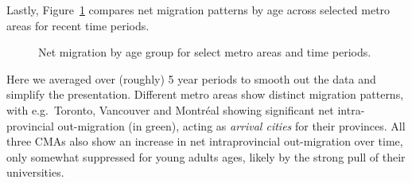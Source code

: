 \documentclass[
  letterpaper,
]{article}
\begin{document}
Lastly, Figure~\ref{fig-metro-age-migration} compares net migration
patterns by age across selected metro areas for recent time periods.

\begin{figure}[H]


\caption{\label{fig-metro-age-migration}Net migration by age group for
select metro areas and time periods.}

\end{figure}%

Here we averaged over (roughly) 5 year periods to smooth out the data
and simplify the presentation. Different metro areas show distinct
migration patterns, with e.g.~Toronto, Vancouver and Montréal showing
significant net intra-provincial out-migration (in green), acting as
\emph{arrival cities} for their provinces. All three CMAs also show an
increase in net intraprovincial out-migration over time, only somewhat
suppressed for young adults ages, likely by the strong pull of their
universities.
\end{document}
